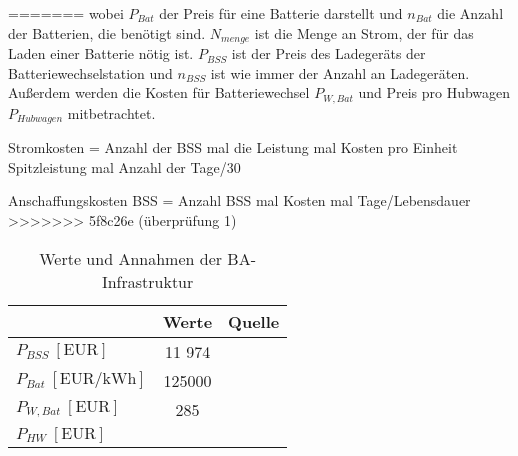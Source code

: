 

=======
wobei $P_{Bat}$ der Preis für eine Batterie darstellt und $n_{Bat}$ die Anzahl der Batterien, die benötigt sind.
$N_{menge}$ ist die Menge an Strom, der für das Laden einer Batterie nötig ist.
$P_{BSS}$ ist der Preis des Ladegeräts der Batteriewechselstation und $n_{BSS}$ ist wie immer der Anzahl an Ladegeräten. %
Außerdem werden die Kosten für Batteriewechsel $P_{W,Bat}$ und Preis pro Hubwagen $P_{Hubwagen}$ mitbetrachtet.
  

Stromkosten = Anzahl der BSS mal die Leistung mal Kosten pro Einheit Spitzleistung mal Anzahl der Tage/30

Anschaffungskosten BSS = Anzahl BSS mal Kosten mal Tage/Lebensdauer
>>>>>>> 5f8c26e (überprüfung 1)




\begin{table}[h]
	\begin{center}
    \caption{Werte und Annahmen der BA-Infrastruktur}
	\label{BA_Infrastrukturtab}
	\begin{tabular}{|l|c|c|}
		\hline
		 & \textbf{Werte} & \textbf{Quelle} \\ \hline
		$P_{BSS} ~[\text{EUR}]$ &  11 974  & \cite{guo2020aviation} \\ \hline
		$P_{Bat} ~[\text{EUR/kWh}]$ & 125000 & \cite{guo2020aviation} \\ \hline
		$P_{W,Bat} ~[\text{EUR}] $ & 285  & \cite{guo2023infrastructure}\\ \hline
      $P_{HW} ~[\text{EUR}] $ &  &\\ \hline
	\end{tabular}
    \end{center}
\end{table}

